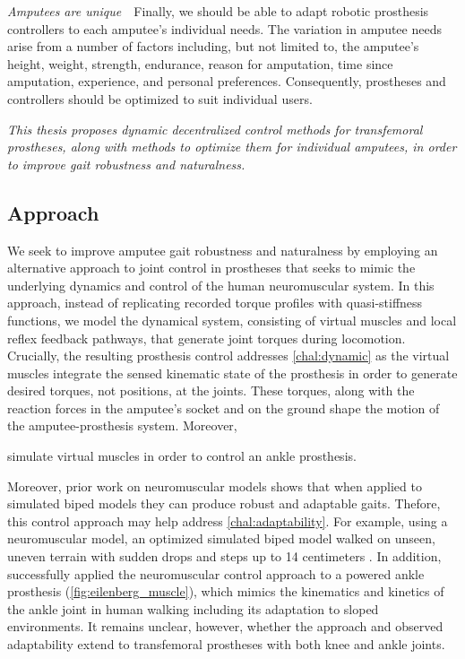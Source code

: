 \begin{challenges}
    \item\label{chal:amputees_unique} \emph{Amputees are unique}~~Finally, we
    should be able to adapt robotic prosthesis controllers to each amputee's
    individual needs. The variation in amputee needs arise from a number of
    factors including, but not limited to, the amputee's height, weight,
    strength, endurance, reason for amputation, time since amputation,
    experience, and personal preferences. Consequently, prostheses and
    controllers should be optimized to suit individual users.
\end{challenges}

\begin{fullwidth} \emph{This thesis proposes dynamic decentralized control
methods for transfemoral prostheses, along with methods to optimize them for
individual amputees, in order to improve gait robustness and naturalness.}
\end{fullwidth}

\subsection{Approach}\label{sec:intro_approach}

We seek to improve amputee gait robustness and naturalness by employing an
alternative approach to joint control in prostheses that seeks to mimic the
underlying dynamics and control of the human neuromuscular system. In this
approach, instead of replicating recorded torque profiles with quasi-stiffness
functions, we model the dynamical system, consisting of virtual muscles and
local reflex feedback pathways, that generate joint torques during locomotion.
Crucially, the resulting prosthesis control addresses \cref{chal:dynamic} as the
virtual muscles integrate the sensed kinematic state of the prosthesis in order
to generate desired torques, not positions, at the joints. These torques, along
with the reaction forces in the amputee's socket and on the ground shape the
motion of the amputee-prosthesis system. Moreover, 
\begin{marginfigure}
    \centering
    \caption{\citet{eilenberg2010control} simulate virtual muscles in
    order to control an ankle prosthesis.}
    \label{fig:eilenberg_muscle}
\end{marginfigure}

Moreover, prior work on neuromuscular models shows that when applied to
simulated biped models they can produce robust and adaptable gaits. Thefore,
this control approach may help address \cref{chal:adaptability}. For example,
using a neuromuscular model, an optimized simulated biped model walked on
unseen, uneven terrain with sudden drops and steps up to 14 centimeters
\citep{song2015neural}. In addition, \citet{eilenberg2010control} successfully
applied the neuromuscular control approach to a powered ankle prosthesis
(\cref{fig:eilenberg_muscle}), which mimics the kinematics and kinetics of the
ankle joint in human walking including its adaptation to sloped environments.
It remains unclear, however, whether the approach and observed adaptability
extend to transfemoral prostheses with both knee and ankle joints.

